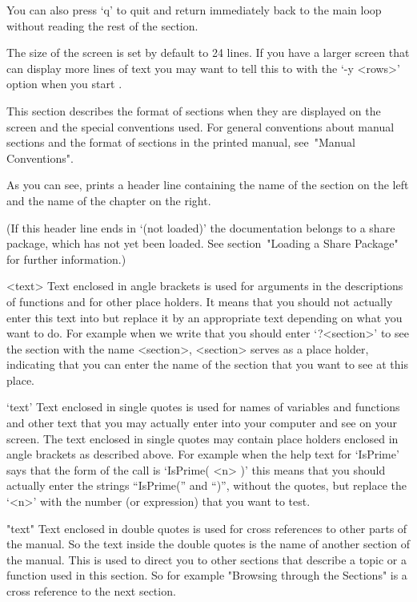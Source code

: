 You can also press `q' to quit and return immediately back to the main
{\GAP} loop without reading the rest of the section.

The size of the screen is set by default to 24 lines.  If you have a larger
screen that can display more lines of text you may want to tell this to
{\GAP} with the `-y <rows>' option when you start {\GAP}.


This section describes the format of sections when they are displayed on
the screen and the special conventions used.
For general conventions about manual sections and the format of sections
in the printed manual, see~"Manual Conventions".

As you can see, {\GAP} prints a header line
containing the name of the section on the left and the name of the
chapter on the right.

(If this header line ends in `(not loaded)' the documentation belongs to a
share package, which has not yet been loaded. See section~"Loading a Share
Package" for further information.)

\begintt
<text>
\endtt
Text enclosed in angle brackets is used for arguments in the descriptions
of functions and for other place holders. It means that you should not
actually enter this text into {\GAP} but replace it by an appropriate
text depending on what you want to do. For example when we write that
you should enter `?<section>' to see the section with the name <section>,
<section> serves as a place holder, indicating that you can enter the
name of the section that you want to see at this place.

\begintt
`text'
\endtt
Text enclosed in single quotes is used for names of variables and
functions and other text that you may actually enter into your computer
and see on your screen. The text enclosed in single quotes may contain
place holders enclosed in angle brackets as described above. For example
when the help text for `IsPrime' says that the form of the call is
`IsPrime( <n> )' this means that you should actually
enter the strings ``IsPrime('' and ``)'', without the quotes,
but replace the `<n>' with the number (or expression)
that you want to test.

\begintt
"text"
\endtt
Text enclosed in double quotes is used for cross references to other
parts of the manual. So the text inside the double quotes is the name of
another section of the manual. This is used to direct you to other
sections that describe a topic or a function used in this section. So
for example "Browsing through the Sections" is a cross reference to the next
section.

